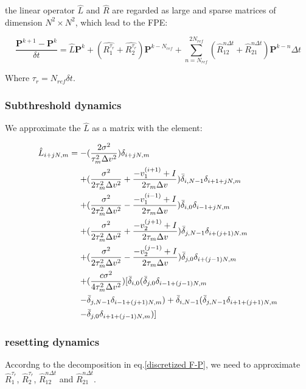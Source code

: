 \documentclass{article}
\begin{document}
	the linear operator $\hat{L}$ and $\hat{R}$ are regarded as large and sparse matrices of dimension $N^2 \times N^2$, which lead to the FPE:
	
	\begin{equation}
		\frac{\textbf{P}^{k+1}-\textbf{P}^k}{\delta t}=\hat{L}\textbf{P}^k+(\hat{R_1^{\tau_r}}+\hat{R_2^{\tau_r}})\textbf{P}^{k-N_{ref}}+\sum_{n=N_{ref}}^{2N_{ref}}(\hat{R}_{12}^{n\Delta t}+\hat{R}_{21}^{n\Delta t})\textbf{P}^{k-n}\Delta t
		\label{discretized F-P}
	\end{equation}
	
	Where $\tau_{r}=N_{ref}\delta t$.
	
	\subsubsection{Subthreshold dynamics}
	
	We approximate the $\hat{L}$ as a matrix with the element: 
	
	\begin{align}
		\hat{L}_{i+jN,m}=-&(\frac{2\sigma^2}{\tau_m^2\Delta v^2})\delta_{i+jN,m}\notag\\
		+&(\frac{\sigma^2}{2\tau_m^2\Delta v^2}+\frac{-v_1^{(i+1)}+I}{2\tau_m\Delta v})\bar{\delta}_{i,N-1}\delta_{i+1+jN,m}\notag\\
		+&(\frac{\sigma^2}{2\tau_m^2\Delta v^2}-\frac{-v_1^{(i-1)}+I}{2\tau_m\Delta v})\bar{\delta}_{i,0}\delta_{i-1+jN,m}\notag\\
		+&(\frac{\sigma^2}{2\tau_m^2\Delta v^2}+\frac{-v_2^{(j+1)}+I}{2\tau_m\Delta v})\bar{\delta}_{j,N-1}\delta_{i+(j+1)N.m}\notag\\
		+&(\frac{\sigma^2}{2\tau_m^2\Delta v^2}-\frac{-v_2^{(j-1)}+I}{2\tau_m\Delta v})\bar{\delta}_{j,0}\delta_{i+(j-1)N,m}\notag\\
		+&(\frac{c\sigma^2}{4\tau_m^2\Delta v^2})[\bar{\delta}_{i,0}(\bar{\delta}_{j,0}\delta_{i-1+(j-1)N,m}\notag\\
		-&\bar{\delta}_{j,N-1}\delta_{i-1+(j+1)N,m})+\bar{\delta}_{i,N-1}(\bar{\delta}_{j,N-1}\delta_{i+1+(j+1)N,m}\notag\\
		-&\bar{\delta}_{j,0}\delta_{i+1+(j-1)N,m})]
	\end{align}
	
	\subsubsection{resetting dynamics}
	
	Accordng to the decomposition in eq.\eqref{discretized F-P}, we need to approximate $\hat{R}_1^{\tau_r}$, $\hat{R}_2^{\tau_r}$, $\hat{R}_{12}^{n\Delta t}$ and $\hat{R}_{21}^{n\Delta t}$.
	
\end{document}
